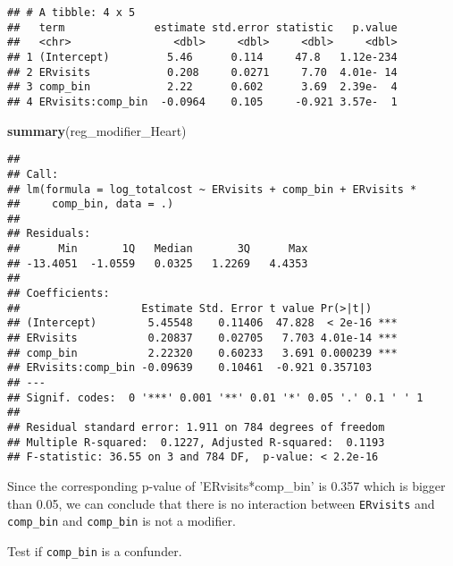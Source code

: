 \documentclass[]{article}
\newenvironment{Shaded}{\begin{snugshade}}{\end{snugshade}}
\newcommand{\KeywordTok}[1]{\textcolor[rgb]{0.13,0.29,0.53}{\textbf{#1}}}
\newcommand{\DataTypeTok}[1]{\textcolor[rgb]{0.13,0.29,0.53}{#1}}
\newcommand{\StringTok}[1]{\textcolor[rgb]{0.31,0.60,0.02}{#1}}
\newcommand{\CommentTok}[1]{\textcolor[rgb]{0.56,0.35,0.01}{\textit{#1}}}
\newcommand{\OperatorTok}[1]{\textcolor[rgb]{0.81,0.36,0.00}{\textbf{#1}}}
\newcommand{\NormalTok}[1]{#1}
\begin{document}
\begin{verbatim}
## # A tibble: 4 x 5
##   term              estimate std.error statistic   p.value
##   <chr>                <dbl>     <dbl>     <dbl>     <dbl>
## 1 (Intercept)         5.46      0.114     47.8   1.12e-234
## 2 ERvisits            0.208     0.0271     7.70  4.01e- 14
## 3 comp_bin            2.22      0.602      3.69  2.39e-  4
## 4 ERvisits:comp_bin  -0.0964    0.105     -0.921 3.57e-  1
\end{verbatim}

\begin{Shaded}
\begin{Highlighting}[]
\KeywordTok{summary}\NormalTok{(reg_modifier_Heart)}
\end{Highlighting}
\end{Shaded}

\begin{verbatim}
## 
## Call:
## lm(formula = log_totalcost ~ ERvisits + comp_bin + ERvisits * 
##     comp_bin, data = .)
## 
## Residuals:
##      Min       1Q   Median       3Q      Max 
## -13.4051  -1.0559   0.0325   1.2269   4.4353 
## 
## Coefficients:
##                   Estimate Std. Error t value Pr(>|t|)    
## (Intercept)        5.45548    0.11406  47.828  < 2e-16 ***
## ERvisits           0.20837    0.02705   7.703 4.01e-14 ***
## comp_bin           2.22320    0.60233   3.691 0.000239 ***
## ERvisits:comp_bin -0.09639    0.10461  -0.921 0.357103    
## ---
## Signif. codes:  0 '***' 0.001 '**' 0.01 '*' 0.05 '.' 0.1 ' ' 1
## 
## Residual standard error: 1.911 on 784 degrees of freedom
## Multiple R-squared:  0.1227, Adjusted R-squared:  0.1193 
## F-statistic: 36.55 on 3 and 784 DF,  p-value: < 2.2e-16
\end{verbatim}

Since the corresponding p-value of 'ERvisits*comp\_bin' is 0.357 which
is bigger than 0.05, we can conclude that there is no interaction
between \texttt{ERvisits} and \texttt{comp\_bin} and \texttt{comp\_bin}
is not a modifier.

Test if \texttt{comp\_bin} is a confunder.

\begin{Shaded}
\end{Shaded}
\end{document}
